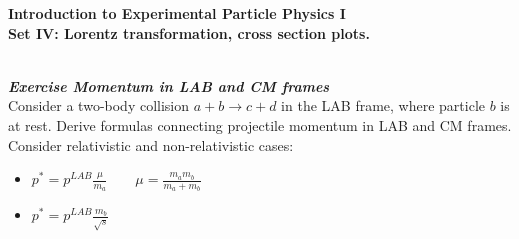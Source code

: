 \documentclass[11pt,a4paper]{article}
\newcounter{zadanie}\newcommand{\zadanie}[1][]{\addtocounter{zadanie}{1} ~\\  {\bf \emph{Exercise \arabic{zadanie} #1 }} \\}
\begin{document}
         

\begin{centering}
  {\bf {\Large
 Introduction to Experimental Particle Physics I \\
  Set IV: Lorentz transformation, cross section plots.
  }} \\  
\end{centering}

\vspace{1cm}
\zadanie[Momentum in LAB and CM frames]

Consider a two-body collision $a + b \to c + d$ in the LAB frame, where 
particle $b$ is at rest. Derive formulas connecting projectile momentum in LAB 
and CM frames. Consider relativistic and non-relativistic cases:

\begin{itemize}
    \item $p^{*} = p^{LAB} \frac{\mu}{m_{a}} \qquad \mu = \frac{m_{a} m_{b}}{m_{a} + m_{b}}$
    \item $p^{*} = p^{LAB} \frac{m_{b}}{\sqrt{s}}$
\end{itemize}
\end{document}
